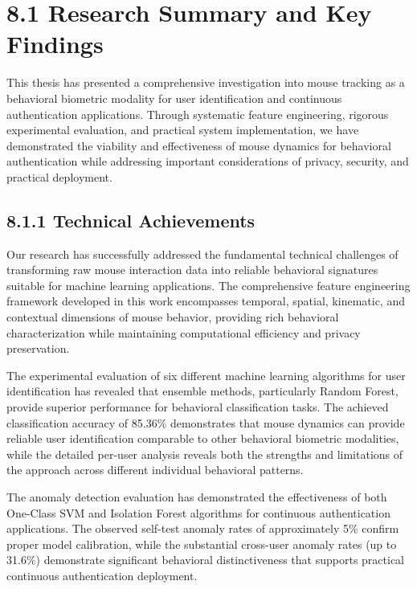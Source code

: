 \documentclass[
  12pt,
  a4paper,
]{report}
\begin{document}
\newpage

\section{8.1 Research Summary and Key
Findings}\label{research-summary-and-key-findings}

This thesis has presented a comprehensive investigation into mouse
tracking as a behavioral biometric modality for user identification and
continuous authentication applications. Through systematic feature
engineering, rigorous experimental evaluation, and practical system
implementation, we have demonstrated the viability and effectiveness of
mouse dynamics for behavioral authentication while addressing important
considerations of privacy, security, and practical deployment.

\subsection{8.1.1 Technical Achievements}\label{technical-achievements}

Our research has successfully addressed the fundamental technical
challenges of transforming raw mouse interaction data into reliable
behavioral signatures suitable for machine learning applications. The
comprehensive feature engineering framework developed in this work
encompasses temporal, spatial, kinematic, and contextual dimensions of
mouse behavior, providing rich behavioral characterization while
maintaining computational efficiency and privacy preservation.

The experimental evaluation of six different machine learning algorithms
for user identification has revealed that ensemble methods, particularly
Random Forest, provide superior performance for behavioral
classification tasks. The achieved classification accuracy of 85.36\%
demonstrates that mouse dynamics can provide reliable user
identification comparable to other behavioral biometric modalities,
while the detailed per-user analysis reveals both the strengths and
limitations of the approach across different individual behavioral
patterns.

The anomaly detection evaluation has demonstrated the effectiveness of
both One-Class SVM and Isolation Forest algorithms for continuous
authentication applications. The observed self-test anomaly rates of
approximately 5\% confirm proper model calibration, while the
substantial cross-user anomaly rates (up to 31.6\%) demonstrate
significant behavioral distinctiveness that supports practical
continuous authentication deployment.
\end{document}
